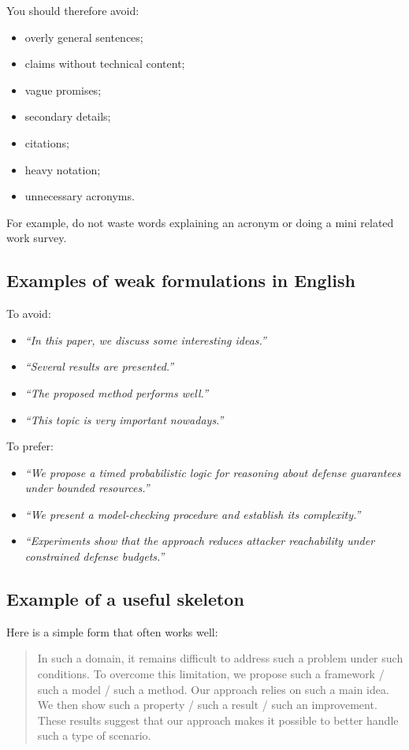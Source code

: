 \documentclass[11pt,a4paper]{article}
\theoremstyle{definition}
\begin{document}
You should therefore avoid:
\begin{itemize}
    \item overly general sentences;
    \item claims without technical content;
    \item vague promises;
    \item secondary details;
    \item citations;
    \item heavy notation;
    \item unnecessary acronyms.
\end{itemize}
For example, do not waste words explaining an acronym or doing a mini related work survey.

\subsection*{Examples of weak formulations in English}

To avoid:
\begin{itemize}
    \item \textit{``In this paper, we discuss some interesting ideas.''}
    \item \textit{``Several results are presented.''}
    \item \textit{``The proposed method performs well.''}
    \item \textit{``This topic is very important nowadays.''}
\end{itemize}

To prefer:
\begin{itemize}
    \item \textit{``We propose a timed probabilistic logic for reasoning about defense guarantees under bounded resources.''}
    \item \textit{``We present a model-checking procedure and establish its complexity.''}
    \item \textit{``Experiments show that the approach reduces attacker reachability under constrained defense budgets.''}
\end{itemize}

\subsection*{Example of a useful skeleton}

Here is a simple form that often works well:

\begin{quote}
In such a domain, it remains difficult to address such a problem under such conditions. To overcome this limitation, we propose such a framework / such a model / such a method. Our approach relies on such a main idea. We then show such a property / such a result / such an improvement. These results suggest that our approach makes it possible to better handle such a type of scenario.
\end{quote}
\end{document}
